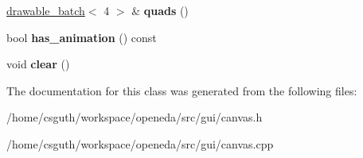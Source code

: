 \begin{DoxyCompactItemize}
\item 
\hypertarget{classophidian_1_1gui_1_1canvas_abbf3d3ad72fb86dca8d946db12299f55}{\hyperlink{classophidian_1_1gui_1_1drawable__batch}{drawable\-\_\-batch}$<$ 4 $>$ \& {\bfseries quads} ()}\label{classophidian_1_1gui_1_1canvas_abbf3d3ad72fb86dca8d946db12299f55}

\item 
\hypertarget{classophidian_1_1gui_1_1canvas_a4b58d0741e1d7d8fbf04ea2f8ef1d3f0}{bool {\bfseries has\-\_\-animation} () const }\label{classophidian_1_1gui_1_1canvas_a4b58d0741e1d7d8fbf04ea2f8ef1d3f0}

\item 
\hypertarget{classophidian_1_1gui_1_1canvas_a4e337a01323367e05b01d67589e23aa5}{void {\bfseries clear} ()}\label{classophidian_1_1gui_1_1canvas_a4e337a01323367e05b01d67589e23aa5}

\end{DoxyCompactItemize}


The documentation for this class was generated from the following files\-:\begin{DoxyCompactItemize}
\item 
/home/csguth/workspace/openeda/src/gui/canvas.\-h\item 
/home/csguth/workspace/openeda/src/gui/canvas.\-cpp\end{DoxyCompactItemize}
